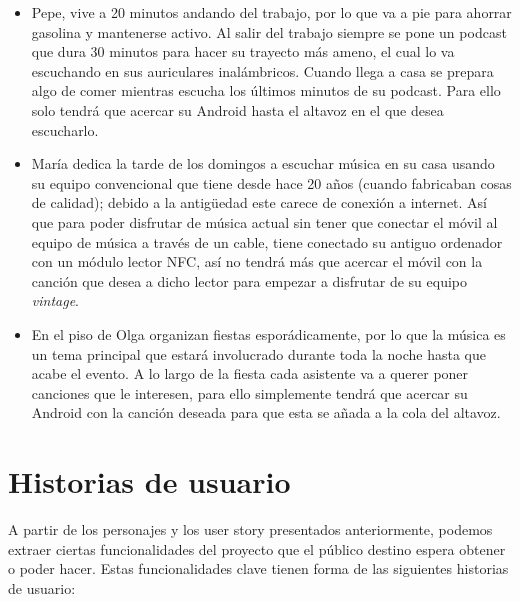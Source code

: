 \begin{itemize}
    \item Pepe, vive a 20 minutos andando del trabajo, por lo que va a
    pie para ahorrar gasolina y mantenerse activo. Al salir del trabajo siempre
    se pone un podcast que dura 30 minutos para hacer su trayecto más ameno, el
    cual lo va escuchando en sus auriculares inalámbricos. Cuando llega a casa
    se prepara algo de comer mientras escucha los últimos minutos de su podcast.
    Para ello solo tendrá que acercar su Android hasta el altavoz en el que
    desea escucharlo.
    \item María dedica la tarde de los domingos a escuchar música en su casa
    usando su equipo convencional que tiene desde hace 20 años (cuando
    fabricaban cosas de calidad); debido a la antigüedad este carece de conexión
    a internet. Así que para poder disfrutar de música actual sin tener que
    conectar el móvil al equipo de música a través de un cable, tiene conectado
    su antiguo ordenador con un módulo lector NFC, así no tendrá más que acercar el
    móvil con la canción que desea a dicho lector para empezar a disfrutar de su
    equipo \emph{vintage}.
    \item En el piso de Olga organizan fiestas esporádicamente, por lo que la
    música es un tema principal que estará involucrado durante toda la noche hasta que
    acabe el evento. A lo largo de la fiesta cada asistente va a querer poner
    canciones que le interesen, para ello simplemente tendrá que acercar su
    Android con la canción deseada para que esta se añada a la cola del altavoz.
\end{itemize}


\section{Historias de usuario}
A partir de los personajes y los user story presentados anteriormente, podemos
extraer ciertas funcionalidades del proyecto que el público destino espera
obtener o poder hacer. Estas funcionalidades clave tienen forma de las
siguientes historias de usuario:

